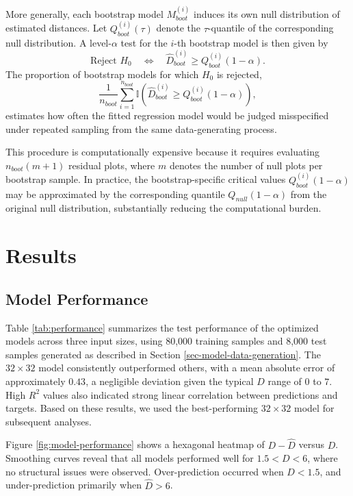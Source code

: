 \documentclass[]{interact}
\theoremstyle{plain}%
\theoremstyle{definition}
\theoremstyle{remark}
\begin{document}
More generally, each bootstrap model \(M_{boot}^{(i)}\) induces its own
null distribution of estimated distances. Let \(Q_{boot}^{(i)}(\tau)\)
denote the \(\tau\)-quantile of the corresponding null distribution. A
level-\(\alpha\) test for the \(i\)-th bootstrap model is then given by
\[\text{Reject } H_0 \quad \Longleftrightarrow \quad \hat{D}_{boot}^{(i)} \ge Q_{boot}^{(i)}(1-\alpha).\]
The proportion of bootstrap models for which \(H_0\) is rejected,
\[\frac{1}{n_{boot}}\sum_{i=1}^{n_{boot}}\mathbb{I}\left(\hat{D}_{boot}^{(i)} \ge Q_{boot}^{(i)}(1-\alpha)\right),\]
estimates how often the fitted regression model would be judged
misspecified under repeated sampling from the same data-generating
process.

This procedure is computationally expensive because it requires
evaluating \(n_{boot}(m + 1)\) residual plots, where \(m\) denotes the
number of null plots per bootstrap sample. In practice, the
bootstrap-specific critical values \(Q_{boot}^{(i)}(1-\alpha)\) may be
approximated by the corresponding quantile \(Q_{null}(1-\alpha)\) from
the original null distribution, substantially reducing the computational
burden.

\section{Results}\label{sec-model-results}

\subsection{Model Performance}\label{model-performance}

Table \ref{tab:performance} summarizes the test performance of the
optimized models across three input sizes, using 80,000 training samples
and 8,000 test samples generated as described in Section
\ref{sec-model-data-generation}. The \(32 \times 32\) model consistently
outperformed others, with a mean absolute error of approximately
\(0.43\), a negligible deviation given the typical \(D\) range of \(0\)
to \(7\). High \(R^2\) values also indicated strong linear correlation
between predictions and targets. Based on these results, we used the
best-performing \(32 \times 32\) model for subsequent analyses.

Figure \ref{fig:model-performance} shows a hexagonal heatmap of
\(D - \hat{D}\) versus \(D\). Smoothing curves \citep[fitted by
generalized additive models,][]{hastie2017generalized} reveal that all
models performed well for \(1.5 < D < 6\), where no structural issues
were observed. Over-prediction occurred when \(D < 1.5\), and
under-prediction primarily when \(\hat{D} > 6\).
\end{document}
